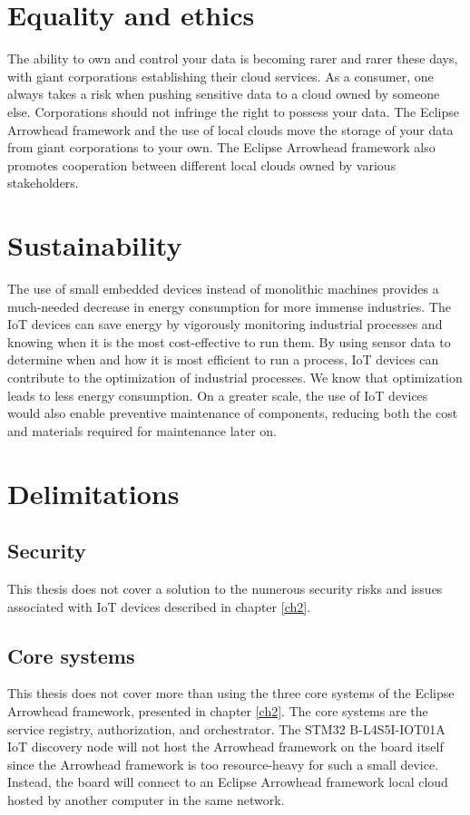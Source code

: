 \section{Equality and ethics}
The ability to own and control your data is becoming rarer and rarer these days, with giant corporations establishing their cloud services.
As a consumer, one always takes a risk when pushing sensitive data to a cloud owned by someone else. Corporations should not infringe the right to possess your data. 
The Eclipse Arrowhead framework and the use of local clouds move the storage of your data from giant corporations to your own.
The Eclipse Arrowhead framework also promotes cooperation between different local clouds owned by various stakeholders. 
\section{Sustainability}
The use of small embedded devices instead of monolithic machines provides a much-needed decrease in energy consumption for more immense industries.
The IoT devices can save energy by vigorously monitoring industrial processes and knowing when it is the most cost-effective to run them.
By using sensor data to determine when and how it is most efficient to run a process, IoT devices can contribute to the optimization of industrial processes.
We know that optimization leads to less energy consumption.
On a greater scale, the use of IoT devices would also enable preventive maintenance of components, reducing both the cost and materials required for maintenance later on.
\section{Delimitations}
\subsection{Security}
This thesis does not cover a solution to the numerous security risks and issues associated with IoT devices described in chapter \ref{ch2}. 
\subsection{Core systems}
This thesis does not cover more than using the three core systems of the Eclipse Arrowhead framework, presented in chapter \ref{ch2}. The core systems are the service registry, authorization, and orchestrator. 
The STM32 B-L4S5I-IOT01A IoT discovery node will not host the Arrowhead framework on the board itself since the Arrowhead framework is too resource-heavy for such a small device.
Instead, the board will connect to an Eclipse Arrowhead framework local cloud hosted by another computer in the same network. 
